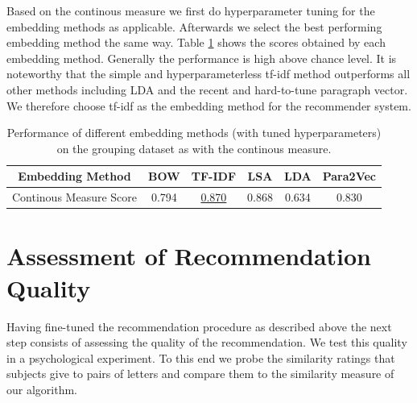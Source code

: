 Based on the continous measure we first do hyperparameter tuning for the embedding methods as applicable. Afterwards we select the best performing embedding method the same way. Table \ref{table:continuous_measure} shows the scores obtained by each embedding method. Generally the performance is high above chance level. It is noteworthy that the simple and hyperparameterless tf-idf method outperforms all other methods including LDA and the recent and hard-to-tune paragraph vector. We therefore choose tf-idf as the embedding method for the recommender system.
\begin{table}
	\begin{tabular}{|c||c|c|c|c|c|}
		\hline 
		Embedding Method & BOW & TF-IDF & LSA & LDA  & Para2Vec\tabularnewline
		\hline 
		\hline 
		Continous Measure Score & 0.794 & \underline{0.870} & 0.868 & 0.634 & 0.830\tabularnewline
		\hline 
	\end{tabular}
	\caption{Performance of different embedding methods (with tuned hyperparameters) on the grouping dataset as with the continous measure.}
	\label{table:continuous_measure}
\end{table}



\section{Assessment of Recommendation Quality}
Having fine-tuned the recommendation procedure as described above the next step consists of assessing the quality of the recommendation. We test this quality in a psychological experiment. To this end we probe the similarity ratings that subjects give to pairs of letters and compare them to the similarity measure of our algorithm.

